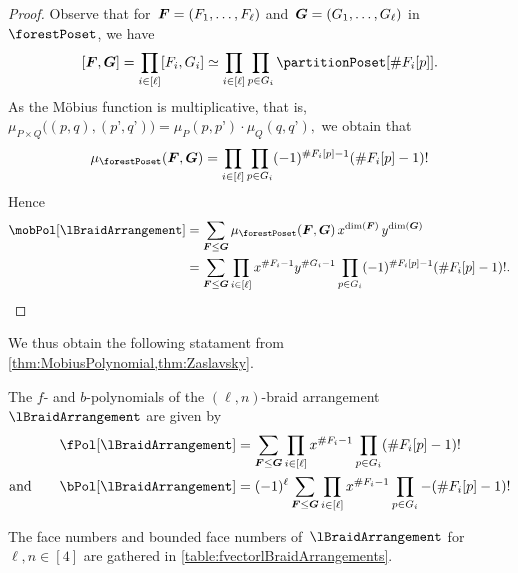 \begin{proof}
Observe that for~$\boldsymbol{F} = (F_1, \dots, F_\ell)$ and~$\boldsymbol{G} = (G_1, \dots, G_\ell)$ in~$\forestPoset$, we have
\[
[\b{F}, \b{G}] = \prod_{i \in [\ell]} [F_i, G_i] \simeq \prod_{i \in [\ell]} \prod_{p \in G_i} \partitionPoset[{\#F_i[p]}].
\]
As the M\"obius function is multiplicative, that is,
\(
\mu_{P \times Q} \big( (p,q), (p’,q’) \big) = \mu_P(p,p’) \cdot \mu_Q(q,q’),
\)
we obtain that
\[
\mu_{\forestPoset}(\b{F}, \b{G}) = \prod_{i \in [\ell]} \prod_{p \in G_i} (-1)^{\#F_i[p]-1} (\# F_i[p]-1)!
\]
Hence
\begin{align*}
\mobPol[\lBraidArrangement] 
& = \sum_{\b{F} \le \b{G}} \mu_{\forestPoset}(\b{F}, \b{G}) \, x^{\dim(\b{F})} \, y^{\dim(\b{G})} \\
& = \sum_{\b{F} \le \b{G}} \prod_{i \in [\ell]} x^{\#F_i-1} y^{\#G_i-1} \prod_{p \in G_i} (-1)^{\#F_i[p]-1} (\# F_i[p]-1)!.
\qedhere
\end{align*}
\end{proof}

We thus obtain the following statament from \cref{thm:MobiusPolynomial,thm:Zaslavsky}.

\begin{corollary}
\label{coro:fbvectorslBraidArrangement}
The $f$- and $b$-polynomials of the $(\ell,n)$-braid arrangement~$\lBraidArrangement$ are given by
\begin{align*}
\fPol[\lBraidArrangement] & = \sum_{\b{F} \le \b{G}} \prod_{i \in [\ell]} x^{\#F_i-1} \prod_{p \in G_i} (\# F_i[p]-1)!\\
\text{and}\qquad
\bPol[\lBraidArrangement] & = (-1)^\ell \sum_{\b{F} \le \b{G}} \prod_{i \in [\ell]} x^{\#F_i-1} \prod_{p \in G_i} -(\# F_i[p]-1)!
\end{align*}
\end{corollary}

The face numbers and bounded face numbers of~$\lBraidArrangement$ for~$\ell, n \in [4]$ are gathered in \cref{table:fvectorlBraidArrangements}.

